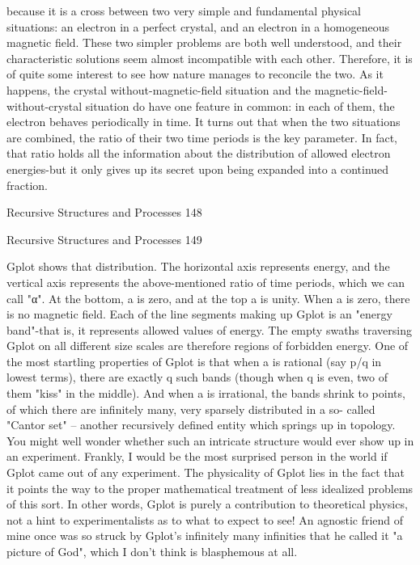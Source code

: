 because it is a cross between two very simple and fundamental physical situations: an
electron in a perfect crystal, and an electron in a homogeneous magnetic field. These two
simpler problems are both well understood, and their characteristic solutions seem almost
incompatible with each other. Therefore, it is of quite some interest to see how nature
manages to reconcile the two. As it happens, the crystal without-magnetic-field situation
and the magnetic-field-without-crystal situation do have one feature in common: in each
of them, the electron behaves periodically in time. It turns out that when the two
situations are combined, the ratio of their two time periods is the key parameter. In fact,
that ratio holds all the information about the distribution of allowed electron energies-but
it only gives up its secret upon being expanded into a continued fraction.




Recursive Structures and Processes                                                         148

Recursive Structures and Processes   149

        Gplot shows that distribution. The horizontal axis represents energy, and the
vertical axis represents the above-mentioned ratio of time periods, which we can call "α".
At the bottom, a is zero, and at the top a is unity. When a is zero, there is no magnetic
field. Each of the line segments making up Gplot is an "energy band"-that is, it represents
allowed values of energy. The empty swaths traversing Gplot on all different size scales
are therefore regions of forbidden energy. One of the most startling properties of Gplot is
that when a is rational (say p/q in lowest terms), there are exactly q such bands (though
when q is even, two of them "kiss" in the middle). And when a is irrational, the bands
shrink to points, of which there are infinitely many, very sparsely distributed in a so-
called "Cantor set" -- another recursively defined entity which springs up in topology.
        You might well wonder whether such an intricate structure would ever show up in
an experiment. Frankly, I would be the most surprised person in the world if Gplot came
out of any experiment. The physicality of Gplot lies in the fact that it points the way to
the proper mathematical treatment of less idealized problems of this sort. In other words,
Gplot is purely a contribution to theoretical physics, not a hint to experimentalists as to
what to expect to see! An agnostic friend of mine once was so struck by Gplot's infinitely
many infinities that he called it "a picture of God", which I don't think is blasphemous at
all.

